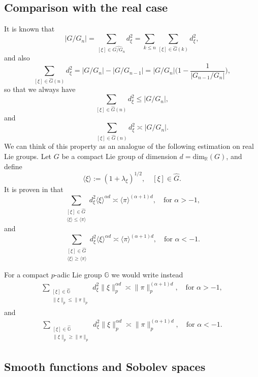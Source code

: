 \documentclass[12pt, reqno]{amsart}
\newcommand{\R}{\mathbb{R}}
\newcommand{\1}{\mathds{1}}
\newcommand{\G}{\mathbb{G}}
\begin{document}
\subsection{Comparison with the real case}

It is known that
\[
|G/G_n| = \sum_{[\xi] \in \widehat{G/G_n}} d_\xi^2 = \sum_{k \le n} \sum_{[\xi] \in \widehat{G}(k)} d_\xi^2,
\]
and also
\[
\sum_{[\xi] \in \widehat{G}(n)} d_\xi^2 = |G/G_n| - |G/G_{n-1}| = |G/G_n|\Big(1 - \frac{1}{|G_{n-1}/G_n|}\Big),
\]
so that we always have
\[
\sum_{[\xi] \in \widehat{G}(n)} d_\xi^2 \leq |G/G_n|,
\]
and 
\[
\sum_{[\xi] \in \widehat{G}(n)} d_\xi^2 \asymp |G/G_n|.
\]
We can think of this property as an analogue of the following estimation on real Lie groups. Let $G$ be a compact Lie group of dimension $d= \mathrm{dim}_\R (G)$, and define
\[
\langle \xi \rangle := (1+\lambda_\xi)^{1/2}, \quad [\xi] \in \widehat{G}.
\]It is proven in \cite{AkylzhanovNets} that 
\begin{equation}
\sum_{\substack{[\xi] \in \widehat{G} \\ \langle \xi \rangle \leq \langle \pi \rangle}} d_\xi^2
\langle \xi \rangle^{\alpha d}   \asymp \langle \pi \rangle^{(\alpha+1)d}, \quad \text{for } \alpha > -1,
\tag{4.4}
\end{equation}
and
\begin{equation}
\sum_{\substack{[\xi] \in \widehat{G} \\ \langle \xi \rangle \geq \langle \pi \rangle}}d_\xi^2
\langle \xi \rangle^{\alpha d}    \asymp \langle \pi \rangle^{(\alpha+1)d}, \quad \text{for } \alpha < -1.
\tag{4.5}
\end{equation}

For a compact $p$-adic Lie group $\G$ we would write instead \begin{align*}
    \sum_{\substack{[\xi] \in \widehat{\G} \\ \| \xi\|_p \leq \| \pi \|_p}} d_\xi^2 \| \xi \|_p^{\alpha d} \asymp \| \pi \|_p^{(\alpha + 1 )d}, \quad \text{for } \alpha > -1,
\end{align*}
and
\begin{align*}
    \sum_{\substack{[\xi] \in \widehat{\G} \\ \| \xi \|_p \geq \| \pi \|_p}}d_\xi^2
\| \xi \|_p^{\alpha d}    \asymp \| \pi \|_p^{(\alpha+1)d}, \quad \text{for } \alpha < -1.
\end{align*}


\subsection{Smooth functions and Sobolev spaces}
\end{document}
